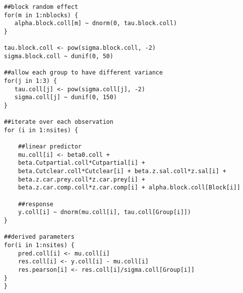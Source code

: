 \begin{lstlisting}
##block random effect
for(m in 1:nblocks) {
   alpha.block.coll[m] ~ dnorm(0, tau.block.coll)
}

tau.block.coll <- pow(sigma.block.coll, -2)
sigma.block.coll ~ dunif(0, 50)

##allow each group to have different variance
for(j in 1:3) {
   tau.coll[j] <- pow(sigma.coll[j], -2)
   sigma.coll[j] ~ dunif(0, 150)
}

##iterate over each observation
for (i in 1:nsites) {

    ##linear predictor  
    mu.coll[i] <- beta0.coll +
    beta.Cutpartial.coll*Cutpartial[i] +
    beta.Cutclear.coll*Cutclear[i] + beta.z.sal.coll*z.sal[i] +
    beta.z.car.prey.coll*z.car.prey[i] +
    beta.z.car.comp.coll*z.car.comp[i] + alpha.block.coll[Block[i]]

    ##response
    y.coll[i] ~ dnorm(mu.coll[i], tau.coll[Group[i]])
}

##derived parameters
for(i in 1:nsites) {
    pred.coll[i] <- mu.coll[i]
    res.coll[i] <- y.coll[i] - mu.coll[i]
    res.pearson[i] <- res.coll[i]/sigma.coll[Group[i]]
}
}
\end{lstlisting}



